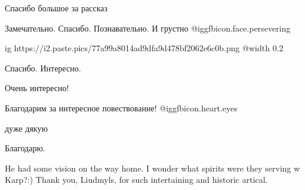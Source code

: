 \begin{itemize}
Спасибо большое за рассказ

Замечательно. Спасибо. Познавательно.
И грустно  @igg{fbicon.face.persevering} 


\ifcmt
  ig https://i2.paste.pics/77a99a8014ad9dfa9d478bf2062e6c0b.png
  @width 0.2
\fi

Спасибо. Интересно.

Очень интересно!

Благодарим за интересное повествование!  @igg{fbicon.heart.eyes} 

дуже дякую

Благодарю.


He had some vision on the way home. I wonder what spirits were they serving w
Karp?:) Thank you, Liudmyls, for such intertaining and historic artical.


\end{itemize} %

